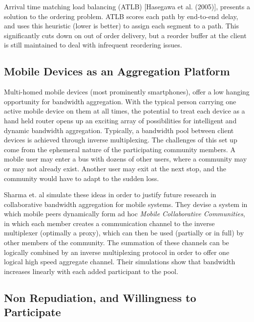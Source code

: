 \documentclass[12pt]{article}
\begin{document}
	Arrival time matching load balancing (ATLB) [Hasegawa et al. (2005)], presents a solution to the ordering problem. ATLB scores each path by end-to-end delay, and uses this heuristic (lower is better) to assign each segment to a path. This significantly cuts down on out of order delivery, but a reorder buffer at the client is still maintained to deal with infrequent reordering issues.

\subsection{Mobile Devices as an Aggregation Platform}
	Multi-homed mobile devices (most prominently smartphones), offer a low hanging opportunity for bandwidth aggregation. With the typical person carrying one active mobile device on them at all times, the potential to treat each device as a hand held router opens up an exciting array of possibilities for intelligent and dynamic bandwidth aggregation. Typically, a bandwidth pool between client devices is achieved through inverse multiplexing. The challenges of this set up come from the ephemeral nature of the participating community members. A mobile user may enter a bus with dozens of other users, where a community may or may not already exist. Another user may exit at the next stop, and the community would have to adapt to the sudden loss.

	Sharma et. al simulate these ideas in order to justify future research in collaborative bandwidth aggregation for mobile systems. They devise a system in which mobile peers dynamically form ad hoc {\it Mobile Collaborative Communities}, in which each member creates a communication channel to the inverse multiplexer (optimally a proxy), which can then be used (partially or in full) by other members of the community. The summation of these channels can be logically combined by an inverse multiplexing protocol in order to offer one logical high speed aggregate channel\cite{1363842}. Their simulations show that bandwidth increases linearly with each added participant to the pool\cite{1363842}.




\subsection{Non Repudiation, and Willingness to Participate}
\end{document}
